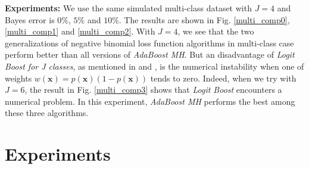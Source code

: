 \documentclass[a4paper,twoside,12pt]{article}
\begin{document}
\begin{center}
\end{center}

\textbf{Experiments:} We use the same simulated multi-class dataset with $J = 4$ and Bayes error is $0\%$, $5\%$ and $10\%$. The results are shown in Fig. \ref{multi_comp0}, \ref{multi_comp1} and \ref{multi_comp2}. With $J=4$, we see that the two generalizations of negative binomial loss function algorithms in multi-class case perform better than all versions of \textsl{AdaBoost MH}. But an disadvantage of \textsl{Logit Boost for J classes}, as mentioned in \cite{boost} and \cite{trebst}, is the numerical instability when one of weights $w(\textbf{x}) = p(\textbf{x})(1 - p(\textbf{x}))$ tends to zero. Indeed, when we try with $J=6$, the result in Fig. \ref{multi_comp3} shows that \textsl{Logit Boost} encounters a numerical problem. In this experiment, \textsl{AdaBoost MH} performs the best among these three algorithms.

\section{Experiments}
\end{document}

